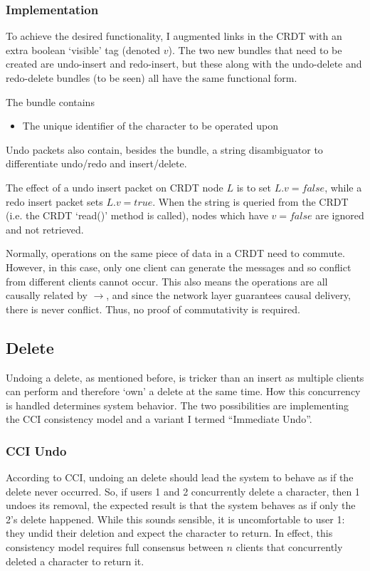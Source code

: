\documentclass[12pt,a4paper,twoside,openright]{report}
\begin{document}
		\subsubsection{Implementation}
		
		To achieve the desired functionality, I augmented links in the CRDT with an extra boolean `visible' tag (denoted $v$). The two new bundles that need to be created are undo-insert and redo-insert, but these along with the undo-delete and redo-delete bundles (to be seen) all have the same functional form.
		 
		The bundle contains
		\begin{itemize}
			\item The unique identifier of the character to be operated upon
		\end{itemize}
		
		Undo packets also contain, besides the bundle, a string disambiguator to differentiate undo/redo and insert/delete.
		
		The effect of a undo insert packet on CRDT node $L$ is to set $L.v = false$, while a redo insert packet sets $L.v = true$. When the string is queried from the CRDT (i.e. the CRDT `read()' method is called), nodes which have $v = false$ are ignored and not retrieved.
		
		Normally, operations on the same piece of data in a CRDT need to commute. However, in this case, only one client can generate the messages and so conflict from different clients cannot occur. This also means the operations are all causally related by $\rightarrow$, and since the network layer guarantees causal delivery, there is never conflict. Thus, no proof of commutativity is required.
		
	\subsection{Delete}
		Undoing a delete, as mentioned before, is tricker than an insert as multiple clients can perform and therefore `own' a delete at the same time. How this concurrency is handled determines system behavior. The two possibilities are implementing the CCI consistency model and a variant I termed ``Immediate Undo''.
		
		\subsubsection{CCI Undo}
		According to CCI, undoing an delete should lead the system to behave as if the delete never occurred. So, if users 1 and 2 concurrently delete a character, then 1 undoes its removal, the expected result is that the system behaves as if only the 2's delete happened. While this sounds sensible, it is uncomfortable to user 1: they undid their deletion and expect the character to return. In effect, this consistency model requires full consensus between $n$ clients that concurrently deleted a character to return it.
		
\end{document}
